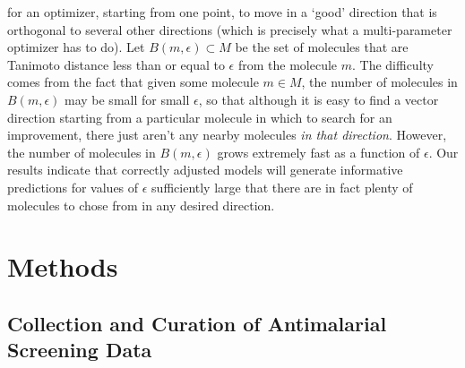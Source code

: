 \documentclass[journal=jacsat,manuscript=article]{achemso}
\begin{document}
for an optimizer, starting from one point, to move in a `good' direction that is orthogonal to several other directions (which is precisely what a multi-parameter optimizer has to do).  Let $B(m, \epsilon) \subset M$ be the set of molecules that are Tanimoto distance less than or equal to $\epsilon$ from the molecule $m$.  The difficulty comes from the fact that given some molecule $m \in M$, the number of molecules in  $B(m, \epsilon)$ may be small for small $\epsilon$, so that although it is easy to find a vector direction starting from a particular molecule in which to search for an improvement, there just aren't any nearby molecules \textit{in that direction}. However, the number of molecules in $B(m, \epsilon)$ grows extremely fast as a function of $\epsilon$.  Our results indicate that correctly adjusted models will generate informative predictions for values of $\epsilon$ sufficiently large that there are in fact plenty of molecules to chose from in any desired direction.


\section*{Methods}

\subsection*{Collection and Curation of Antimalarial Screening Data}
\end{document}
